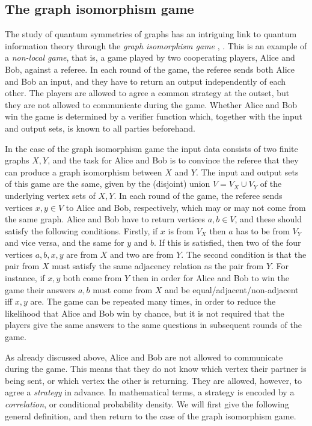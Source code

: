 \documentclass[a4paper]{amsart}
\numberwithin{equation}{section}
\theoremstyle{change}
\begin{document}
\subsection{The graph isomorphism game} 

The study of quantum symmetries of graphs has an intriguing link to quantum information theory through 
the \emph{graph isomorphism game} \cite{ATSERIAS_MANCINSKA_ROBERSON_SAMAL_SEVERINI_VARVITSIOTIS_quantumgraphisomorphism}, \cite{LUPINI_MANCINSKA_ROBERSON_quantumpermutationgroups}. This 
is an example of a \emph{non-local game}, that is, a game played by two cooperating players, Alice and Bob, against a referee. In each round of the game, the referee sends both Alice and Bob an input, and they have to return an output independently of each other. The players are allowed to agree a common strategy at the outset, but they are not allowed to communicate during the game.  Whether Alice and Bob win the game is determined by a verifier function which, together with the input and output sets, is known to all parties beforehand. 

In the case of the graph isomorphism game the input data consists of two finite graphs $ X, Y $, and the task for Alice and Bob is to 
convince the referee that they can produce a graph isomorphism between $ X $ and $ Y $. 
The input and output sets of this game are the same, given by the (disjoint) union $ V = V_X \cup V_Y $ of the underlying vertex sets of $ X, Y $. In each round of the game, the referee sends vertices $ x,y \in V $ to Alice and Bob, respectively, which may or may not come from the same graph. 
Alice and Bob have to return vertices $ a,b \in V $, and these should satisfy the following conditions. Firstly, if $ x $ is from $ V_X $ then $ a $ has to be from $ V_Y $ and vice versa, and the same for $ y $ and $ b $. If this is satisfied, then two of the four vertices $ a,b, x, y $ are from $ X $ and two are from $ Y $. The second condition is that the pair from $ X $ must satisfy the same adjacency relation as the pair from $ Y $. For instance,  
if $ x,y $ both come from $ Y $ 
then in order for Alice and Bob to win the game their answers $ a, b $ must come from $ X $ and be equal/adjacent/non-adjacent iff $ x, y $ are. 
The game can be repeated many times, in order to reduce the likelihood that Alice and Bob win by chance, but it is not required that the players give the same answers to the same questions in subsequent rounds of the game. 

As already discussed above, Alice and Bob are not allowed to communicate during the game. This means that they do not know which vertex their partner is being sent, or which vertex 
the other is returning. They are allowed, however, to agree a \emph{strategy} in advance. In mathematical terms, a strategy is encoded by a 
\emph{correlation}, or conditional probability density. We will first give the following general definition, and then return to the case of the graph isomorphism game. 
\end{document}

